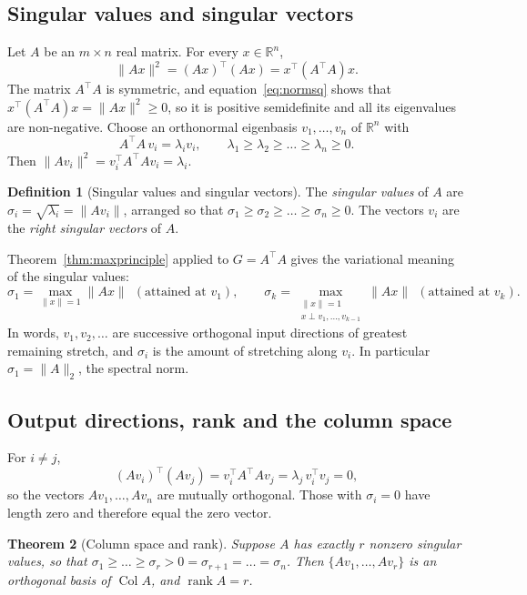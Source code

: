 \documentclass[12pt,a4paper]{report}
\newcommand{\R}{\mathbb{R}}
\newcommand{\norm}[1]{\lVert #1\rVert}
\newcommand{\T}{^{\top}}
\DeclareMathOperator{\rank}{rank}
\DeclareMathOperator{\Col}{Col}
\theoremstyle{plain}
\newtheorem{theorem}{Theorem}[chapter]
\theoremstyle{definition}
\newtheorem{definition}[theorem]{Definition}
\theoremstyle{remark}
\theoremstyle{definition}
\begin{document}
\subsection{Singular values and singular vectors}

Let $A$ be an $m\times n$ real matrix. For every $x\in\R^n$,
\begin{equation}\label{eq:normsq}
\norm{Ax}^2=(Ax)\T(Ax)=x\T(A\T A)x .
\end{equation}
The matrix $A\T A$ is symmetric, and equation~\eqref{eq:normsq} shows that $x\T(A\T A)x=\norm{Ax}^2\ge 0$, so it is positive semidefinite and all its eigenvalues are non-negative. Choose an orthonormal eigenbasis $v_1,\dots,v_n$ of $\R^n$ with
\[
A\T A\,v_i=\lambda_i v_i,\qquad \lambda_1\ge\lambda_2\ge\dots\ge\lambda_n\ge 0 .
\]
Then $\norm{Av_i}^2=v_i\T A\T Av_i=\lambda_i$.

\begin{definition}[Singular values and singular vectors]
The \emph{singular values} of $A$ are $\sigma_i=\sqrt{\lambda_i}=\norm{Av_i}$, arranged so that $\sigma_1\ge\sigma_2\ge\dots\ge\sigma_n\ge 0$. The vectors $v_i$ are the \emph{right singular vectors} of $A$.
\end{definition}

Theorem~\ref{thm:maxprinciple} applied to $G=A\T A$ gives the variational meaning of the singular values:
\[
\sigma_1=\max_{\norm{x}=1}\norm{Ax}\ \ (\text{attained at }v_1),\qquad
\sigma_k=\max_{\substack{\norm{x}=1\\ x\perp v_1,\dots,v_{k-1}}}\norm{Ax}\ \ (\text{attained at }v_k).
\]
In words, $v_1,v_2,\dots$ are successive orthogonal input directions of greatest remaining stretch, and $\sigma_i$ is the amount of stretching along $v_i$. In particular $\sigma_1=\norm{A}_2$, the spectral norm.

\subsection{Output directions, rank and the column space}

For $i\ne j$,
\[
(Av_i)\T(Av_j)=v_i\T A\T A v_j=\lambda_j\,v_i\T v_j=0 ,
\]
so the vectors $Av_1,\dots,Av_n$ are mutually orthogonal. Those with $\sigma_i=0$ have length zero and therefore equal the zero vector.

\begin{theorem}[Column space and rank]\label{thm:colspace}
Suppose $A$ has exactly $r$ nonzero singular values, so that $\sigma_1\ge\dots\ge\sigma_r>0=\sigma_{r+1}=\dots=\sigma_n$. Then $\{Av_1,\dots,Av_r\}$ is an orthogonal basis of $\Col A$, and $\rank A=r$.
\end{theorem}
\end{document}
